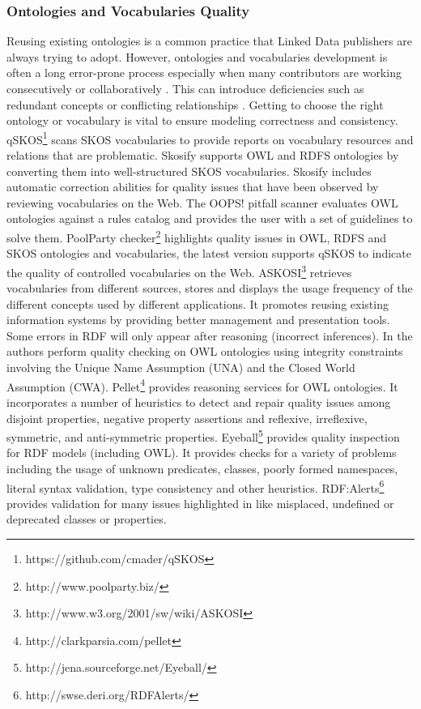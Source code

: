 \documentclass[onecolumn, crcready]{iosart2c}
\begin{document}
\subsubsection {Ontologies and Vocabularies Quality}
Reusing existing ontologies is a common practice that Linked Data publishers are always trying to adopt. However, ontologies and vocabularies development is often a long error-prone process especially when many contributors are working consecutively or collaboratively \cite{Suominen2013}. This can introduce deficiencies such as redundant concepts or conflicting relationships \cite{harpring_introduction_2010}. Getting to choose the right ontology or vocabulary is vital to ensure modeling correctness and consistency.\\ qSKOS\footnote{https://github.com/cmader/qSKOS} \cite{Mader2012} scans SKOS vocabularies to provide reports on vocabulary resources and relations that are problematic. Skosify \cite{Suominen:2012:IQS:2413941.2413985} supports OWL and RDFS ontologies by converting them into well-structured SKOS vocabularies. Skosify includes automatic correction abilities for quality issues that have been observed by reviewing vocabularies on the Web. The OOPS! pitfall scanner \cite{oops} evaluates OWL ontologies against a rules catalog and provides the user with a set of guidelines to solve them. PoolParty checker\footnote{http://www.poolparty.biz/} highlights quality issues in OWL, RDFS and SKOS ontologies and vocabularies, the latest version supports qSKOS to indicate the quality of controlled vocabularies on the Web. ASKOSI\footnote{http://www.w3.org/2001/sw/wiki/ASKOSI} retrieves vocabularies from different sources, stores and displays the usage frequency of the different concepts used by different applications. It promotes reusing existing information systems by providing better management and presentation tools.\\ Some errors in RDF will only appear after reasoning (incorrect inferences). In \cite{conf/owled/SirinSW08}\cite{conf/hicss/TaoDM09} the authors perform quality checking on OWL ontologies using integrity constraints involving the Unique Name Assumption (UNA) and the Closed World Assumption (CWA). Pellet\footnote{http://clarkparsia.com/pellet} provides reasoning services for OWL ontologies. It incorporates a number of heuristics to detect and repair quality issues among disjoint properties, negative property assertions and reflexive, irreflexive, symmetric, and anti-symmetric properties. Eyeball\footnote{http://jena.sourceforge.net/Eyeball/} provides quality inspection for RDF models (including OWL). It provides checks for a variety of problems including the usage of unknown predicates, classes, poorly formed namespaces, literal syntax validation, type consistency and other heuristics. RDF:Alerts\footnote{http://swse.deri.org/RDFAlerts/} provides validation for many issues highlighted in \cite{Hogan2010} like misplaced, undefined or deprecated classes or properties. 
\end{document}
